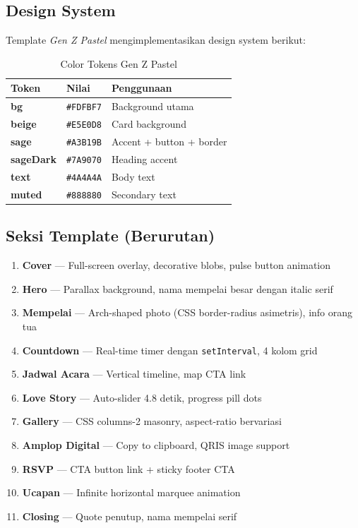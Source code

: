 \documentclass[12pt,a4paper]{article}
\begin{document}
\subsection{Design System}

Template \textit{Gen Z Pastel} mengimplementasikan design system berikut:

\begin{table}[h]
\centering
\begin{tabular}{>{\bfseries}l l l}
\toprule
Token & Nilai & Penggunaan \\
\midrule
bg      & \texttt{\#FDFBF7} & Background utama \\
beige   & \texttt{\#E5E0D8} & Card background \\
sage    & \texttt{\#A3B19B} & Accent + button + border \\
sageDark & \texttt{\#7A9070} & Heading accent \\
text    & \texttt{\#4A4A4A} & Body text \\
muted   & \texttt{\#888880} & Secondary text \\
\bottomrule
\end{tabular}
\caption{Color Tokens Gen Z Pastel}
\end{table}

\subsection{Seksi Template (Berurutan)}

\begin{enumerate}
  \item \textbf{Cover} --- Full-screen overlay, decorative blobs, pulse button animation
  \item \textbf{Hero} --- Parallax background, nama mempelai besar dengan italic serif
  \item \textbf{Mempelai} --- Arch-shaped photo (CSS border-radius asimetris), info orang tua
  \item \textbf{Countdown} --- Real-time timer dengan \texttt{setInterval}, 4 kolom grid
  \item \textbf{Jadwal Acara} --- Vertical timeline, map CTA link
  \item \textbf{Love Story} --- Auto-slider 4.8 detik, progress pill dots
  \item \textbf{Gallery} --- CSS columns-2 masonry, aspect-ratio bervariasi
  \item \textbf{Amplop Digital} --- Copy to clipboard, QRIS image support
  \item \textbf{RSVP} --- CTA button link + sticky footer CTA
  \item \textbf{Ucapan} --- Infinite horizontal marquee animation
  \item \textbf{Closing} --- Quote penutup, nama mempelai serif
\end{enumerate}
\end{document}
